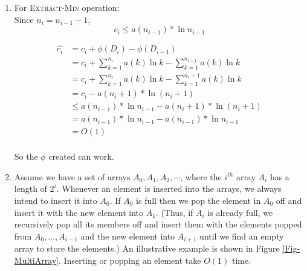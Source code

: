 \documentclass[12pt,a4paper]{article}
\makeatletter
\newtheorem*{solution}{Solution}
\theoremstyle{definition}
\renewenvironment{solution}[1][Solution] {\par\pushQED{\qed}\normalfont\topsep6\p@\@plus6\p@\relax\trivlist\item[\hskip\labelsep\bfseries#1\@addpunct{.}]\ignorespaces}{\popQED\endtrivlist\@endpefalse} \makeatother
\makeatother
\begin{document}
\begin{enumerate}
\begin{solution}
	For \textsc{Extract-Min} operation:\\
	Since $n_i = n_{i-1}-1$, 
	\begin{equation}
	    c_i \leq a\left(n_{i-1}\right) * \ln n_{i-1}
	\end{equation}
	
	\begin{equation}
	\begin{aligned}
	    \hat{c_i} &= c_i + \phi \left(D_i\right) - \phi \left(D_{i-1}\right) \\
	       &= c_i+\sum_{k=1}^{n_i} a\left(k\right) \ln k - \sum_{k=1}^{n_{i-1}} a\left(k\right) \ln k \\
	       &=c_i+\sum_{k=1}^{n_i} a\left(k\right) \ln k - \sum_{k=1}^{n_{i}+1} a\left(k\right) \ln k \\
	       &=c_i - a\left(n_i+1\right) * \ln \left(n_i+1\right) \\
	       &\leq a\left(n_{i-1}\right) * \ln n_{i-1} - a\left(n_i+1\right) * \ln \left( n_i+1\right) \\
	       &= a\left(n_{i-1}\right) * \ln n_{i-1} -a\left(n_{i-1}\right) * \ln n_{i-1} \\
	       &=O\left(1 \right) \\
	\end{aligned}
	\end{equation}
	
	So the $\phi $ created can work.
	
	
	
	
	\end{solution}
    
	
	\item Assume we have a set of arrays $A_0, A_1, A_2,\cdots$, where the $i^{th}$ array $A_i$ has a length of $2^i$. Whenever an element is inserted into the arrays, we always intend to insert it into $A_0$. If $A_0$ is full then we pop the element in $A_0$ off and insert it with the new element into $A_{1}$. (Thus, if $A_{i}$ is already full, we recursively pop all its members off and insert them with the elements popped from $A_0,...,A_{i-1}$ and the new element into $A_{i+1}$ until we find an empty array to store the elements.) An illustrative example is shown in Figure \ref{Fig-MultiArray}. Inserting or popping an element take $O(1)$ time.


\end{enumerate}
\end{document}
